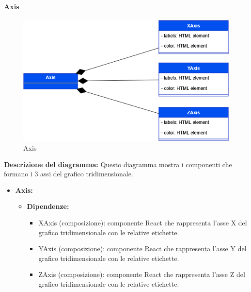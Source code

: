 \paragraph{Axis}
\begin{figure}[h!] \centering
    \includegraphics[scale=0.45]{template/images/uml_front/ui/axis.png}
    \caption{Axis}
\end{figure}
\textbf{Descrizione del diagramma:}
Questo diagramma mostra i componenti che formano i 3 assi del grafico tridimensionale.
\begin{itemize}
    \item \textbf{Axis:}
    \begin{itemize}
        \item \textbf{Dipendenze:}
        \begin{itemize}
            \item XAxis (composizione): componente React che rappresenta l'asse X del grafico tridimensionale con le relative etichette.
            \item YAxis (composizione): componente React che rappresenta l'asse Y del grafico tridimensionale con le relative etichette.
            \item ZAxis (composizione): componente React che rappresenta l'asse Z del grafico tridimensionale con le relative etichette.
        \end{itemize} 
    \end{itemize}
\end{itemize}





